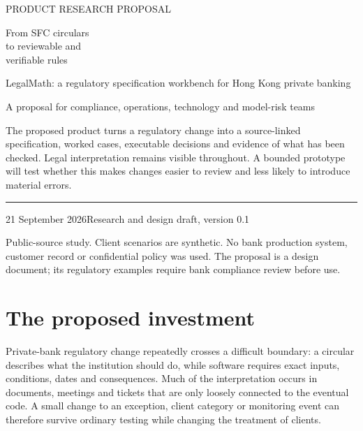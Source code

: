 \documentclass[11pt,a4paper]{article}
\begin{document}
\hypersetup{pageanchor=false}
\begin{titlepage}
\vspace*{20mm}
{\sffamily\color{teal}\large PRODUCT RESEARCH PROPOSAL\par}
\vspace{9mm}
{\sffamily\bfseries\color{navy}\fontsize{31}{36}\selectfont\raggedright From SFC circulars\\to reviewable and\\verifiable rules\par}
\vspace{9mm}
{\Large LegalMath: a regulatory specification workbench for Hong Kong private banking\par}
\vspace{14mm}
{\large A proposal for compliance, operations, technology and model-risk teams\par}
\vfill
\begin{minipage}{0.91\textwidth}
The proposed product turns a regulatory change into a source-linked specification,
worked cases, executable decisions and evidence of what has been checked. Legal
interpretation remains visible throughout. A bounded prototype will test whether
this makes changes easier to review and less likely to introduce material errors.
\end{minipage}
\vspace{18mm}
\hrule
\vspace{5mm}
21 September 2026\hfill Research and design draft, version 0.1\par
\small Public-source study. Client scenarios are synthetic. No bank production
system, customer record or confidential policy was used. The proposal is a design
document; its regulatory examples require bank compliance review before use.
\end{titlepage}
\hypersetup{pageanchor=true}

\section*{The proposed investment}
Private-bank regulatory change repeatedly crosses a difficult boundary: a circular
describes what the institution should do, while software requires exact inputs,
conditions, dates and consequences. Much of the interpretation occurs in documents,
meetings and tickets that are only loosely connected to the eventual code. A small
change to an exception, client category or monitoring event can therefore survive
ordinary testing while changing the treatment of clients.
\end{document}
